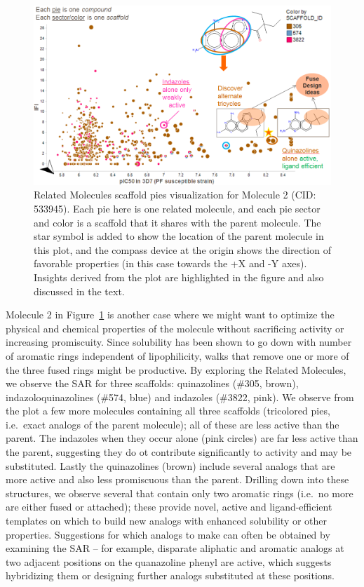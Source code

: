 \documentclass[journal=jacsat,manuscript=article]{achemso}
\newcommand*\fref[1]{Figure~\ref{fig:#1}}
\newcommand*\ie{i.e.~}
\begin{document}
\begin{figure}
\includegraphics[width=6in]{fig/mol2_RGtool_scafpie2.png}
\caption{Related Molecules scaffold pies visualization for Molecule 2 (CID: 533945). Each pie here is one related molecule, and each pie sector and color is a scaffold that it shares with the parent molecule. The star symbol is added to show the location of the parent molecule in this plot, and the compass device at the origin shows the direction of favorable properties (in this case towards the +X and -Y axes). Insights derived from the plot are highlighted in the figure and also discussed in the text.}
\label{fig:scafwalk2}
\end{figure}

Molecule 2 in \fref{scafwalk2} is another case where we might want to optimize the physical and chemical properties of the molecule without sacrificing activity or increasing promiscuity. Since solubility has been shown to go down with number of aromatic rings independent of lipophilicity\cite{Hill2010}, walks that remove one or more of the three fused rings might be productive. By exploring the Related Molecules, we observe the SAR for three scaffolds: quinazolines (\#305, brown), indazoloquinazolines (\#574, blue) and indazoles (\#3822, pink). We observe from the plot a few more molecules containing all three scaffolds (tricolored pies, \ie exact analogs of the parent molecule); all of these are less active than the parent. The indazoles when they occur alone (pink circles) are far less active than the parent, suggesting they do ot contribute significantly to activity and may be substituted. Lastly the quinazolines (brown) include several analogs that are more active and also less promiscuous than the parent. Drilling down into these structures, we observe several that contain only two aromatic rings (\ie no more are either fused or attached); these provide novel, active and ligand-efficient templates on which to build new analogs with enhanced solubility or other properties. Suggestions for which analogs to make can often be obtained by examining the SAR -- for example, disparate aliphatic and aromatic analogs at two adjacent positions on the quanazoline phenyl are active, which suggests hybridizing them or designing further analogs substituted at these positions.
\end{document}
